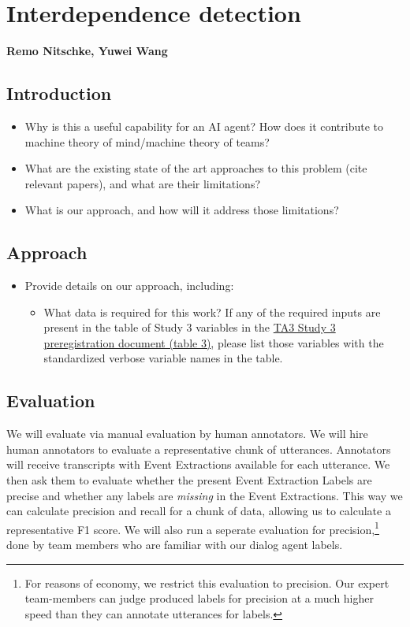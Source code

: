 \chapter{Interdependence detection}
\textbf{Remo Nitschke, Yuwei Wang}
\section{Introduction}
\begin{itemize}
    \item Why is this a useful capability for an AI
        agent? How does it contribute to machine theory of mind/machine theory
        of teams?
    \item What are the existing state of the art approaches to this problem
        (cite relevant papers), and what are their limitations? 
    \item What is our approach, and how will it address those limitations?
\end{itemize}

\section{Approach}
\begin{itemize}
    \item Provide details on our approach, including:
        \begin{itemize}
            \item What data is required for this work? If any of the required
                inputs are present in the table of Study 3 variables in the
                \href{https://docs.google.com/document/d/1GF7VsNF9R95IAaj6mVZUDV2mAX5ok1Bh6Tcm8zDpIkg/edit#heading=h.1ksv4uv}{TA3
                Study 3 preregistration document (table 3)}, please list those
                variables with the standardized verbose variable names in the table.
        \end{itemize}
\end{itemize}

\section{Evaluation}
We will evaluate via manual evaluation by human annotators. We will hire human annotators to evaluate a representative chunk of utterances. Annotators will receive transcripts with Event Extractions available for each utterance. We then ask them to evaluate whether the present Event Extraction Labels are precise and whether any labels are \emph{missing} in the Event Extractions. This way we can calculate precision and recall for a chunk of data, allowing us to calculate a representative F1 score.
We will also run a seperate evaluation for precision,\footnote{For reasons of economy, we restrict this evaluation to precision. Our expert team-members can judge produced labels for precision at a much higher speed than they can annotate utterances for labels.} done by team members who are familiar with our dialog agent labels.

